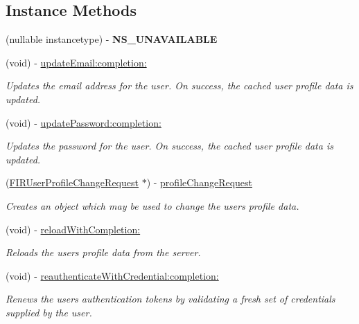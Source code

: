 \subsection*{Instance Methods}
\begin{DoxyCompactItemize}
\item 
\hypertarget{interface_f_i_r_user_ae315671a0c11bffe3e9e2fdf283f1764}{}(nullable instancetype) -\/ {\bfseries N\+S\+\_\+\+U\+N\+A\+V\+A\+I\+L\+A\+B\+L\+E}\label{interface_f_i_r_user_ae315671a0c11bffe3e9e2fdf283f1764}

\item 
(void) -\/ \hyperlink{interface_f_i_r_user_a4cec31ca7bbf11546ad76868505a39c3}{update\+Email\+:completion\+:}
\begin{DoxyCompactList}\small\item\em Updates the email address for the user. On success, the cached user profile data is updated. \end{DoxyCompactList}\item 
(void) -\/ \hyperlink{interface_f_i_r_user_a2e9ca3593f5feade6434cd34570d6ae2}{update\+Password\+:completion\+:}
\begin{DoxyCompactList}\small\item\em Updates the password for the user. On success, the cached user profile data is updated. \end{DoxyCompactList}\item 
(\hyperlink{interface_f_i_r_user_profile_change_request}{F\+I\+R\+User\+Profile\+Change\+Request} $\ast$) -\/ \hyperlink{interface_f_i_r_user_a20f1b11b76c8f6fffe529f69b687b017}{profile\+Change\+Request}
\begin{DoxyCompactList}\small\item\em Creates an object which may be used to change the user\textquotesingle{}s profile data. \end{DoxyCompactList}\item 
(void) -\/ \hyperlink{interface_f_i_r_user_ac9a4e0578dcbe4abee62143fa2b25f66}{reload\+With\+Completion\+:}
\begin{DoxyCompactList}\small\item\em Reloads the user\textquotesingle{}s profile data from the server. \end{DoxyCompactList}\item 
(void) -\/ \hyperlink{interface_f_i_r_user_afa881b98220684503c5141afbb60e83d}{reauthenticate\+With\+Credential\+:completion\+:}
\begin{DoxyCompactList}\small\item\em Renews the user\textquotesingle{}s authentication tokens by validating a fresh set of credentials supplied by the user. \end{DoxyCompactList}\item 

\end{DoxyCompactItemize}
